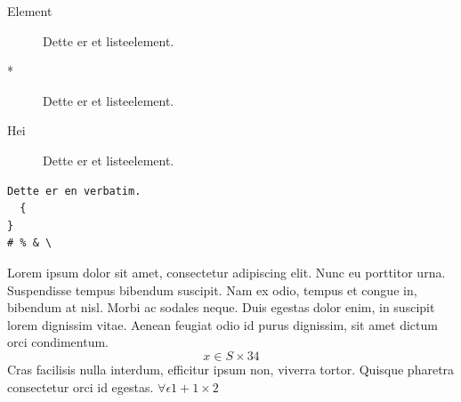 \documentclass[12pt]{article}
\begin{document}
\begin{description}
\item[Element] Dette er et listeelement.
\item[*] Dette er et listeelement.
\item[Hei] Dette er et listeelement.
\end{description}

\newpage

\begin{verbatim}
Dette er en verbatim.
  {
}
# % & \
\end{verbatim}


Lorem ipsum dolor sit amet, consectetur adipiscing elit. Nunc eu porttitor urna. Suspendisse tempus bibendum suscipit. Nam ex odio, tempus et congue in, bibendum at nisl. Morbi ac sodales neque. Duis egestas dolor enim, in suscipit lorem dignissim vitae. Aenean feugiat odio id purus dignissim, sit amet dictum orci condimentum. 
\begin{equation}
x \in S \times 34
\end{equation}
Cras facilisis nulla interdum, efficitur ipsum non, viverra tortor. Quisque pharetra consectetur orci id egestas. $\forall \epsilon 1 + 1 \times 2$
\end{document}
